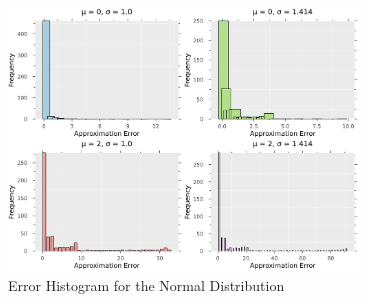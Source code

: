 \begin{figure}[H]
    \centering
    \includegraphics[width=0.83\textwidth]{figures/error_histogram.pdf}
    \caption{Error Histogram for the Normal Distribution}
    \label{fig:error_histogram}
\end{figure}




